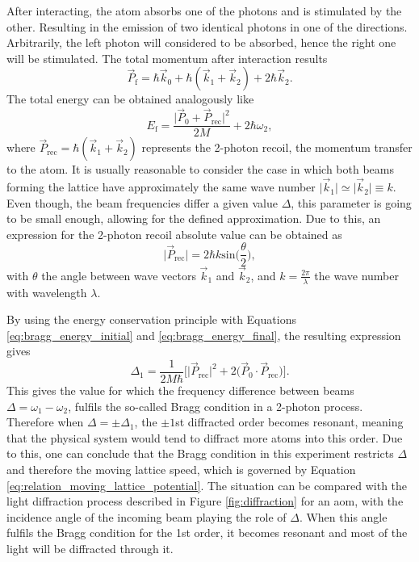 After interacting, the atom absorbs one of the photons and is stimulated by the other. Resulting in the emission of two identical photons in one of the directions. Arbitrarily, the left photon will considered to be absorbed, hence the right one will be stimulated. The total momentum after interaction results
\begin{equation}
	\vec{P}_\text{f} = \hbar \vec{k}_0 + \hbar (\vec{k}_1 + \vec{k}_2) + 2\hbar\vec{k}_2.
\end{equation}
The total energy can be obtained analogously like 
 \begin{equation}\label{eq:bragg_energy_final}
 	E_\text{f} = \frac{\mathopen\big|\vec{P}_0+\vec{P}_\text{rec}\mathclose\big|^2}{2M} + 2\hbar\omega_2,
 \end{equation}
 where $\vec{P}_\text{rec} = \hbar (\vec{k}_1 + \vec{k}_2)$ represents the 2-photon recoil, the momentum transfer to the atom. It is usually reasonable to consider the case in which both beams forming the lattice have approximately the same wave number $\mathopen\big|\vec{k}_1\mathclose\big| \simeq \mathopen\big|\vec{k}_2\mathclose\big| \equiv k$. Even though, the beam frequencies differ a given value $\Delta$, this parameter is going to be small enough, allowing for the defined approximation. Due to this, an expression for the 2-photon recoil absolute value can be obtained as
\begin{equation}\label{eq:two_photon_recoil}
	\mathopen\big|\vec{P}_\text{rec}\mathclose\big| = 2 \hbar k \text{sin}\bigg(\frac{\theta}{2}\bigg),
\end{equation}
with $\theta$ the angle between wave vectors $\vec{k}_1$ and $\vec{k}_2$, and $k=\frac{2\pi}{\lambda}$ the wave number with wavelength $\lambda$.

By using the energy conservation principle with Equations \eqref{eq:bragg_energy_initial} and \eqref{eq:bragg_energy_final}, the resulting expression gives
\begin{equation}\label{eq:Bragg_condition_1}
	 \Delta_1 = \frac{1}{2M\hbar}\bigg[\mathopen\big|\vec{P}_{\text{rec}}\mathclose\big|^2 + 2\big(\vec{P}_0 \cdot \vec{P}_{\text{rec}}\big)\bigg].
\end{equation}
This gives the value for which the frequency difference between beams $\Delta = \omega_1-\omega_2$, fulfils the so-called Bragg condition in a 2-photon process. Therefore when $\Delta = \pm\Delta_1$, the $\pm1$st diffracted order becomes resonant, meaning that the physical system would tend to diffract more atoms into this order. Due to this, one can conclude that the Bragg condition in this experiment restricts $\Delta$ and therefore the moving lattice speed, which is governed by Equation \eqref{eq:relation_moving_lattice_potential}. The situation can be compared with the light diffraction process described in Figure \ref{fig:diffraction} for an \ac{aom}, with the incidence angle of the incoming beam playing the role of $\Delta$. When this angle fulfils the Bragg condition for the 1st order, it becomes resonant and most of the light will be diffracted through it. 

